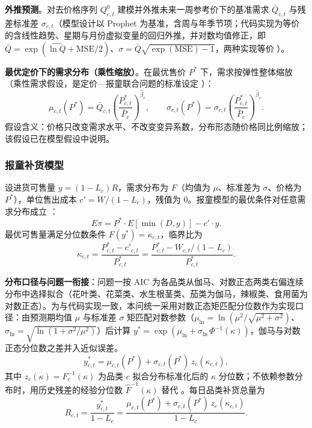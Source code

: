 \textbf{外推预测}。对去价格序列 $Q^0_{c,t}$ 建模并外推未来一周参考价下的基准需求 $\bar Q_{c,t}$ 与残差标准差 $\sigma_{c,t}$（模型设计以 Prophet 为基准，含周与年季节项；代码实现为等价的含线性趋势、星期与月份虚拟变量的回归外推，并对数均值修正，即 $\bar Q=\exp(\widehat{\ln Q}+\mathrm{MSE}/2)$、$\sigma=\bar Q\sqrt{\exp(\mathrm{MSE})-1}$，两种实现等价 \cite{taylor2018,hyndman2018}）。

\textbf{最优定价下的需求分布（乘性缩放）}。在最优售价 $P^*$ 下，需求按弹性整体缩放（乘性需求假设，是定价—报童联合问题的标准设定 \cite{petruzzi1999}）：
\begin{equation}
\mu_{c,t}(P^*)=\bar Q_{c,t}\left(\frac{P^*_{c,t}}{\bar P_c}\right)^{\hat\beta_c},\qquad \sigma_{c,t}(P^*)=\sigma_{c,t}\left(\frac{P^*_{c,t}}{\bar P_c}\right)^{\hat\beta_c}.
\end{equation}
假设含义：价格只改变需求水平、不改变变异系数，分布形态随价格同比例缩放；该假设已在模型假设中说明。

\subsubsection{报童补货模型}
\label{sec:newsvendor}

设进货可售量 $y=(1-L_c)R$，需求分布为 $F$（均值为 $\mu$、标准差为 $\sigma$、价格为 $P^*$），单位售出成本 $c'=W/(1-L_c)$，残值为 0。报童模型的最优条件对任意需求分布成立 \cite{silver2016,khouja1999,petruzzi1999}：
\begin{equation}
E\pi=P^*\cdot E[\min(D,y)]-c'\cdot y.
\end{equation}
最优可售量满足分位数条件 $F(y^*)=\kappa_{c,t}$，临界比为
\begin{equation}
\kappa_{c,t}=\frac{P^*_{c,t}-c'_{c,t}}{P^*_{c,t}}=\frac{P^*_{c,t}-W_{c,t}/(1-L_c)}{P^*_{c,t}}.
\end{equation}

\textbf{分布口径与问题一衔接}：问题一按 AIC 为各品类从伽马、对数正态两类右偏连续分布中选择拟合（花叶类、花菜类、水生根茎类、茄类为伽马，辣椒类、食用菌为对数正态）。为与代码实现一致，本问统一采用对数正态矩匹配分位数作为实现口径：由预测期均值 $\mu$ 与标准差 $\sigma$ 矩匹配对数参数（$\mu_{\ln}=\ln\left(\mu^2/\sqrt{\mu^2+\sigma^2}\right)$、$\sigma_{\ln}=\sqrt{\ln\left(1+\sigma^2/\mu^2\right)}$）后计算 $y^*=\exp\left(\mu_{\ln}+\sigma_{\ln}\,\Phi^{-1}(\kappa)\right)$，伽马与对数正态分位数之差并入近似误差。
\begin{equation}
y^*_{c,t}=\mu_{c,t}(P^*)+\sigma_{c,t}(P^*)\,z_c(\kappa_{c,t}),
\end{equation}
其中 $z_c(\kappa)=F_c^{-1}(\kappa)$ 为品类 $c$ 拟合分布标准化后的 $\kappa$ 分位数；不依赖参数分布时，用历史残差的经验分位数 $\hat F^{-1}(\kappa)$ 替代 \cite{agrawal1996}。每日品类补货总量为
\begin{equation}
R_{c,t}=\frac{y^*_{c,t}}{1-L_c}=\frac{\mu_{c,t}(P^*)+\sigma_{c,t}(P^*)\,z_c(\kappa_{c,t})}{1-L_c}.
\end{equation}

